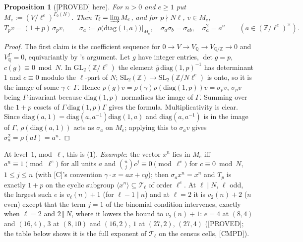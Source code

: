 \documentclass[11pt]{article}
\newcommand{\Z}{\mathbb{Z}}
\newcommand{\Q}{\mathbb{Q}}
\newcommand{\SL}{\mathrm{SL}}
\newcommand{\GL}{\mathrm{GL}}
\newcommand{\Ga}{\Gamma}
\newcommand{\PROVED}{\textsf{\small[PROVED]}}
\newcommand{\CMPD}{\textsf{\small[CMPD]}}
\newtheorem*{proposition*}{Proposition}
\begin{document}
\begin{proposition*}[\PROVED{} here]\label{prop:pg-tors} For $n>0$ and $e\ge1$ put $M_e:=(V/\ell^{e})^{\Ga_0(N)}$. Then $\mathcal T_\ell=\varinjlim M_e$, and for $p\nmid N\ell$, $v\in M_e$,
\[ T_pv=(1+p)\,\sigma_p v,\qquad \sigma_a:=\rho\bigl(\mathrm{diag}(1,a)\bigr)\big|_{M_e},\quad \sigma_a\sigma_b=\sigma_{ab},\quad \sigma_a^{2}=a^{n}\qquad(a\in(\Z/\ell^{e})^\times). \]
\end{proposition*}
\begin{proof}
The first claim is the coefficient sequence for $0\to V\to V_\Q\to V_{\Q/\Z}\to0$ and $V_\Q^{\Ga}=0$, equivariantly by {}'s argument. Let $g$ have integer entries, $\det g=p$, $c(g)\equiv0\bmod N$. In $\GL_2(\Z/\ell^{e})$ the element $\bar g\,\mathrm{diag}(1,p)^{-1}$ has determinant $1$ and $c\equiv0$ modulo the $\ell$-part of $N$; $\SL_2(\Z)\to\SL_2(\Z/N\ell^{e})$ is onto, so it is the image of some $\gamma\in\Ga$. Hence $\rho(g)v=\rho(\gamma)\rho(\mathrm{diag}(1,p))v=\sigma_pv$, $\sigma_pv$ being $\Ga$-invariant because $\mathrm{diag}(1,p)$ normalises the image of $\Ga$. Summing over the $1+p$ cosets of $\Ga\,\mathrm{diag}(1,p)\Ga$ gives the formula. Multiplicativity is clear. Since $\mathrm{diag}(a,1)=\mathrm{diag}(a,a^{-1})\mathrm{diag}(1,a)$ and $\mathrm{diag}(a,a^{-1})$ is in the image of $\Ga$, $\rho(\mathrm{diag}(a,1))$ acts as $\sigma_a$ on $M_e$; applying this to $\sigma_av$ gives $\sigma_a^{2}=\rho(aI)=a^{n}$.
\end{proof}
At level~$1$, mod~$\ell$, this is {}(1). \emph{Example}: the vector $x^{n}$ lies in $M_e$ iff $a^{n}\equiv1\pmod{\ell^{e}}$ for all units $a$ and $\binom njc^{j}\equiv0\pmod{\ell^{e}}$ for $c\equiv0\bmod N$, $1\le j\le n$ (with [C]'s convention $\gamma\cdot x=ax+cy$); then $\sigma_ax^{n}=x^{n}$ and $T_p$ is exactly $1+p$ on the cyclic subgroup $\langle x^{n}\rangle\subseteq\mathcal T_\ell$ of order $\ell^{e}$. At $\ell\mid N$, $\ell$ odd, the largest such $e$ is $v_\ell(n)+1$ (for $\ell-1\mid n$) and at $\ell=2$ it is $v_2(n)+2$ ($n$ even) except that the term $j=1$ of the binomial condition intervenes, exactly when $\ell=2$ and $2\,\Vert\,N$, where it lowers the bound to $v_2(n)+1$: $e=4$ at $(8,4)$ and $(16,4)$, $3$ at $(8,10)$ and $(16,2)$, $1$ at $(27,2)$, $(27,4)$ (\PROVED; the table below shows it is the full exponent of $\mathcal T_\ell$ on the census cells, \CMPD).
\end{document}
